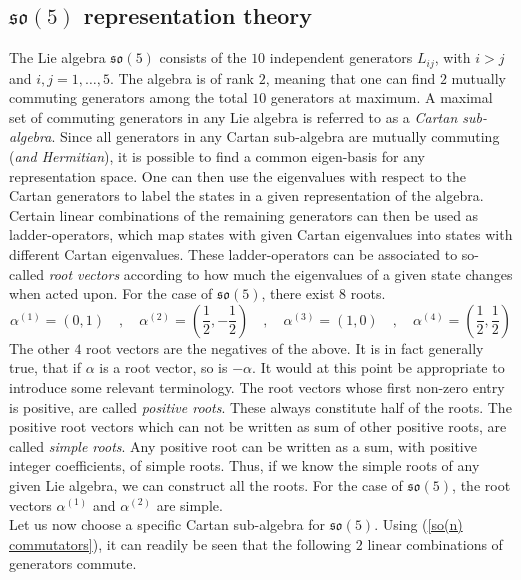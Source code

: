 \subsection{$\mathfrak{so}(5)$ representation theory}
The Lie algebra $\mathfrak{so}(5)$ consists of the $10$ independent generators $L_{ij}$, with $i > j$ and $i,j = 1,\ldots,5$. The algebra is of rank $2$, meaning that one can find $2$ mutually commuting generators among the total $10$ generators at maximum. A maximal set of commuting generators in any Lie algebra is referred to as a \textit{Cartan sub-algebra}. Since all generators in any Cartan sub-algebra are mutually commuting (\textit{and Hermitian}), it is possible to find a common eigen-basis for any representation space. One can then use the eigenvalues with respect to the Cartan generators to label the states in a given representation of the algebra. Certain linear combinations of the remaining generators can then be used as ladder-operators, which map states with given Cartan eigenvalues into states with different Cartan eigenvalues. These ladder-operators can be associated to so-called \textit{root vectors} according to how much the eigenvalues of a given state changes when acted upon. For the case of $\mathfrak{so}(5)$, there exist $8$ roots.
%
%
\begin{equation}
\alpha^{(1)} = \left( 0 , 1 \right)
%
\quad , \quad
%
\alpha^{(2)} = \left( \frac{1}{2} , -\frac{1}{2} \right)
%
\quad , \quad
%
\alpha^{(3)} = \left( 1 , 0 \right)
%
\quad , \quad
%
\alpha^{(4)} = \left( \frac{1}{2} , \frac{1}{2} \right)
\end{equation}
%
%
The other $4$ root vectors are the negatives of the above. It is in fact generally  true, that if $\alpha$ is a root vector, so is $-\alpha$. It would at this point be appropriate to introduce some relevant terminology. The root vectors whose first non-zero entry is positive, are called \textit{positive roots}. These always constitute half of the roots. The positive root vectors which can not be written as sum of other positive roots, are called \textit{simple roots}. Any positive root can be written as a sum, with positive integer coefficients, of simple roots. Thus, if we know the simple roots of any given Lie algebra, we can construct all the roots. For the case of $\mathfrak{so}(5)$, the root vectors $\alpha^{(1)}$ and $\alpha^{(2)}$ are simple.\\
Let us now choose a specific Cartan sub-algebra for $\mathfrak{so}(5)$. Using (\ref{so(n) commutators}), it can readily be seen that the following $2$ linear combinations of generators commute.
